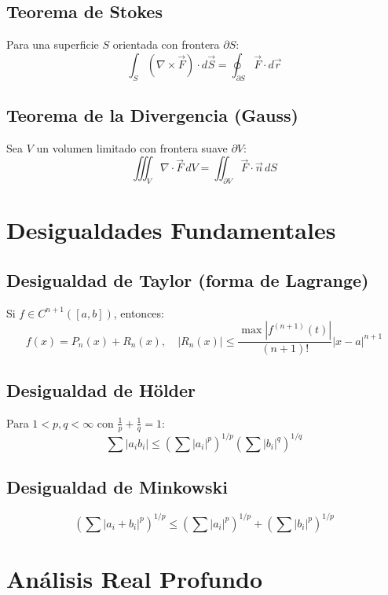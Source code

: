 \documentclass[12pt]{article}
\begin{document}
\subsection{Teorema de Stokes}
Para una superficie \(S\) orientada con frontera \(\partial S\):
\[
\int_S (\nabla \times \vec{F}) \cdot d\vec{S} = \oint_{\partial S} \vec{F} \cdot d\vec{r}
\]

\subsection{Teorema de la Divergencia (Gauss)}
Sea \(V\) un volumen limitado con frontera suave \(\partial V\):
\[
\iiint_V \nabla \cdot \vec{F} \,dV = \iint_{\partial V} \vec{F} \cdot \vec{n} \,dS
\]

\section{Desigualdades Fundamentales}

\subsection{Desigualdad de Taylor (forma de Lagrange)}
Si \(f \in C^{n+1}([a,b])\), entonces:
\[
f(x) = P_n(x) + R_n(x),\quad |R_n(x)| \leq \frac{\max |f^{(n+1)}(t)|}{(n+1)!} |x - a|^{n+1}
\]

\subsection{Desigualdad de Hölder}
Para \(1 < p, q < \infty\) con \(\frac{1}{p} + \frac{1}{q} = 1\):
\[
\sum |a_i b_i| \leq \left( \sum |a_i|^p \right)^{1/p} \left( \sum |b_i|^q \right)^{1/q}
\]

\subsection{Desigualdad de Minkowski}
\[
\left( \sum |a_i + b_i|^p \right)^{1/p} \leq \left( \sum |a_i|^p \right)^{1/p} + \left( \sum |b_i|^p \right)^{1/p}
\]









\newpage

\section{Análisis Real Profundo}
\end{document}
